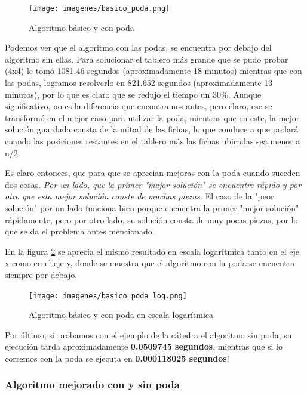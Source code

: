 \documentclass[11pt,a4paper]{article}
\begin{document}
	\begin{figure}[H]
    	\begin{center}
        	\texttt{[image: imagenes/basico\_poda.png]}
    	\end{center}
    	\caption{Algoritmo básico y con poda}
    	\label{fig:basico_poda}
	\end{figure}

Podemos ver que el algoritmo con las podas, se encuentra por debajo del algoritmo sin ellas. Para solucionar el tablero más grande que se pudo probar (4x4) le tomó 1081.46 segundos (aproximadamente 18 minutos) mientras que con las podas, logramos resolverlo en 821.652 segundos (aproximadamente 13 minutos), por lo que es claro que se redujo el tiempo un $30\%$. Aunque significativo, no es la diferencia que encontramos antes, pero claro, ese se transformó en el mejor caso para utilizar la poda, mientras que en este, la mejor solución guardada consta de la mitad de las fichas, lo que conduce a que podará cuando las posiciones restantes en el tablero más las fichas ubicadas sea menor a n/2.

Es claro entonces, que para que se aprecian mejoras con la poda cuando suceden dos cosas. \textit{Por un lado, que la primer "mejor solución" se encuentre rápido y por otro que esta mejor solución conste de muchas piezas.} El caso de la "peor solución" por un lado funciona bien porque encuentra la primer "mejor solución" rápidamente, pero por otro lado, su solución consta de muy pocas piezas, por lo que se da el problema antes mencionado.

En la figura \ref{fig:basico_poda_log} se aprecia el mismo resultado en escala logarítmica tanto en el eje x como en el eje y, donde se muestra que el algoritmo con la poda se encuentra siempre por debajo.

	\begin{figure}[H]
    	\begin{center}
        	\texttt{[image: imagenes/basico\_poda\_log.png]}
    	\end{center}
    	\caption{Algoritmo básico y con poda en escala logarítmica}
    	\label{fig:basico_poda_log}
	\end{figure}

Por último, si probamos con el ejemplo de la cátedra el algoritmo sin poda, su ejecución tarda aproximadamente \textbf{0.0509745 segundos}, mientras que si lo corremos con la poda se ejecuta en \textbf{0.000118025 segundos}!

\subsubsection*{Algoritmo mejorado con y sin poda}
\end{document}
